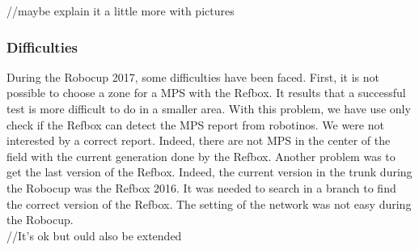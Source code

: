 //maybe explain it a little more with pictures



\subsubsection{Difficulties}

During the Robocup 2017, some difficulties have been faced. First, it is not possible to choose a zone for a MPS with the Refbox. It results that a successful test is more difficult to do in a smaller area. With this problem, we have use only check if the Refbox can detect the MPS report from robotinos. We were not interested by a correct report. Indeed, there are not MPS in the center of the field with the current generation done by the Refbox. Another problem was to get the last version of the Refbox. Indeed, the current version in the trunk during the Robocup was the Refbox 2016. It was needed to search in a branch to find the correct version of the Refbox. The setting of the network was not easy during the Robocup. \\

//It's ok but ould also be extended
